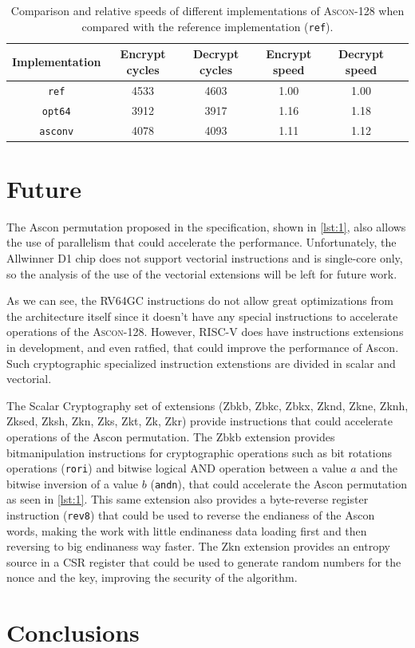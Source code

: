 \documentclass[11pt,twoside]{article}
\begin{document}
\begin{table}[h]
  \centering
  \begin{tabular}{|c|c|c|c|c|c|}
    \hline
    \textbf{Implementation} & \textbf{Encrypt cycles} &
    \textbf{Decrypt cycles} & \textbf{Encrypt speed}  & \textbf{Decrypt speed}               \\ \hline

    \texttt{ref}            & 4533                    & 4603                   & 1.00 & 1.00 \\ \hline

    \texttt{opt64}          & 3912                    & 3917                   & 1.16 & 1.18 \\ \hline

    \texttt{asconv}         & 4078                    & 4093                   & 1.11 & 1.12 \\ \hline
  \end{tabular}
  \caption{Comparison and relative speeds of different implementations of \textsc{Ascon-128} when compared with the reference implementation (\texttt{ref}).}
\end{table}



\section{Future}

The Ascon permutation proposed in the specification, shown in \cref{lst:1}, also allows the use of parallelism that could accelerate the performance. Unfortunately, the Allwinner D1 chip does not support vectorial instructions and is single-core only, so the analysis of the use of the vectorial extensions will be left for future work.

As we can see, the RV64GC instructions do not allow great optimizations from the architecture itself since it doesn't have any special instructions to accelerate operations of the \textsc{Ascon-128}. However, RISC-V does have instructions extensions in development, and even ratfied, that could improve the performance of Ascon. Such cryptographic specialized instruction extenstions are divided in scalar and vectorial.

The Scalar Cryptography set of extensions (Zbkb, Zbkc, Zbkx, Zknd, Zkne, Zknh, Zksed, Zksh, Zkn, Zks, Zkt, Zk, Zkr) \cite{riscvCryptoVol1} provide instructions that could accelerate operations of the Ascon permutation. The Zbkb extension provides bitmanipulation instructions for cryptographic operations such as bit rotations operations (\texttt{rori}) and bitwise logical AND operation between a value $a$ and the bitwise inversion of a value $b$ (\texttt{andn}), that could accelerate the Ascon permutation as seen in \cref{lst:1}. This same extension also provides a byte-reverse register instruction (\texttt{rev8}) that could be used to reverse the endianess of the Ascon words, making the work with little endinaness data loading first and then reversing to big endinaness way faster. The Zkn extension provides an entropy source in a CSR register that could be used to generate random numbers for the nonce and the key, improving the security of the algorithm.


\section{Conclusions}

\printbibliography
\end{document}

